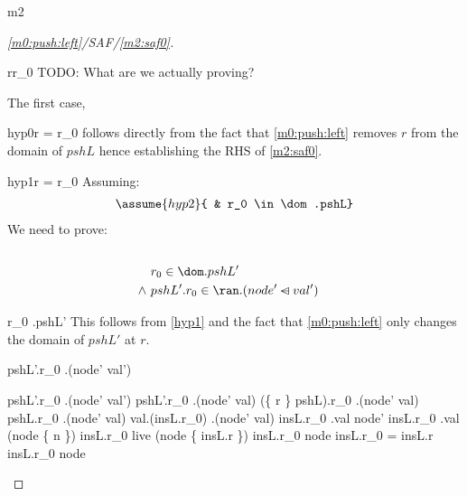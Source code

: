 \documentclass[12pt]{amsart}
\begin{document}
\begin{machine}{m2}
\newcommand{\finter}{\binter}
\begin{proof}[\ref{m0:push:left}/SAF/\ref{m2:saf0}]
	\begin{free:var}{r}{r_0}
	TODO: What are we actually proving?
	\begin{by:cases}
	The first case,
	\begin{case}{hyp0}{r = r_0}
		follows directly from the fact that \ref{m0:push:left} removes
		$r$ from the domain of $pshL$ hence establishing the RHS of \eqref{m2:saf0}.
		\easy
	\end{case}		
	\begin{case}{hyp1}{\neg r = r_0}
		Assuming:
		\begin{align*}
		\assume{hyp2}{ & r_0 \in \dom.pshL}
		\end{align*}
		We need to prove:
		\begin{align*}
		\\ \goal{& r_0 \in \dom.pshL' 
		\\	\land ~ & pshL'.r_0 \in \ran.(node' \domsub val') }
		\end{align*}
		\begin{by:parts}
		\begin{part:a}{ r_0 \in \dom.pshL' }
		This follows from \eqref{hyp1} and the fact that \ref{m0:push:left} only changes the domain of $pshL'$ at $r$.
			\easy
		\end{part:a}
		\begin{part:a}{pshL'.r_0 \in \ran.(node' \domsub val')}
		\begin{calculation}
			pshL'.r_0 \in \ran.(node' \domsub val')
		\hint{=}{ \eqref{m2:a2} }
			pshL'.r_0 \in \ran.(node'  \domsub val)
		\hint{=}{ \eqref{m1:a0} }
			(\{ r \} \domsub pshL).r_0 \in 
			\ran.(node' \domsub val)
		\hint{=}{ \eqref{hyp1} }
			pshL.r_0 \in \ran.(node' \domsub val)
			val.(insL.r_0) \in \ran.(node' \domsub val)
		\hint{\follows}{  }
			insL.r_0 \in \dom.val \setminus node'
		\hint{=}{ \eqref{m2:a1} }
			insL.r_0 \in 
					\dom.val \setminus (node \bunion \{ n \}) 
		\hint{=}{ \eqref{m2:inv1} ,
				  \eqref{m2:inv6} ,
				  \eqref{m2:grd2} }
			insL.r_0 \in live \setminus (node \bunion \{ insL.r \}) 
		\hint{=}{ 	\eqref{hyp2} ,
					\eqref{m2:inv5} }
			\neg insL.r_0 \in node \1\land \neg insL.r_0 = insL.r
		\hint{=}{ \eqref{m2:inv7}, 
				\eqref{hyp1}, 
				\eqref{hyp2}, 
				\eqref{m1:grd1},
				\eqref{m2:inv5} }
			\neg insL.r_0 \in node
		\hint{\follows}{ \eqref{m2:inv8}; 
				\eqref{hyp2}; 
				\eqref{m2:inv5} }
			\true
		\end{calculation}
		\end{part:a}
		\end{by:parts}
	\end{case}		
	\end{by:cases}
	\end{free:var}
\end{proof}


\end{machine}
\end{document}

